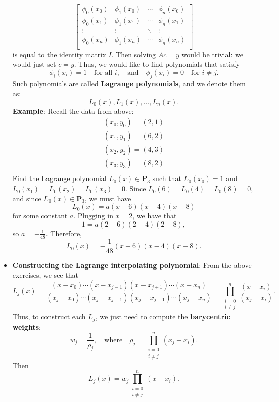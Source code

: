 \documentclass{report}
\begin{document}
\begin{itemize}
$$\begin{bmatrix}
        \phi_0(x_0) & \phi_1(x_0) & \cdots & \phi_n(x_0)\\
        \phi_0(x_1) & \phi_1(x_1) & \cdots & \phi_n(x_1)\\
        \vdots & \vdots & \ddots & \vdots\\
        \phi_0(x_n) & \phi_1(x_n) & \cdots & \phi_n(x_n)\\
    \end{bmatrix}
    $$
    is equal to the identity matrix $I$. Then solving $Ac = y$ would be trivial: we would just set $c = y$.
    \bigbreak \noindent 
    Thus, we would like to find polynomials that satisfy
    $$
    \phi_i(x_i) = 1 \quad \text{for all } i, \quad \text{and} \quad \phi_j(x_i) = 0 \quad \text{for } i \neq j.
    $$
    Such polynomials are called \textbf{Lagrange polynomials}, and we denote them as:
    $$L_0(x), L_1(x), \ldots, L_n(x).$$
    \bigbreak \noindent 
    \textbf{Example}: Recall the data from above:
    \begin{align*}
        (x_0,y_0) = (2,1)\\
        (x_1,y_1) = (6,2)\\
        (x_2, y_2) = (4,3)\\
        (x_3, y_3) = (8,2)\\
    \end{align*}
    Find the Lagrange polynomial $L_0(x) \in \mathbf{P}_3$ such that $L_0(x_0) = 1$ and $L_0(x_1) = L_0(x_2) = L_0(x_3) = 0$.
    \bigbreak \noindent 
    Since $L_0(6)= L_0(4) = L_0(8) = 0$, and since $L_0(x) \in \mathbf{P}_3$, we must have
    $$L_0(x) = a(x-6)(x-4)(x-8)$$
    for some constant $a$.
    \bigbreak \noindent 
    Plugging in $x = 2$, we have that
    $$1 = a(2-6)(2-4)(2-8),$$
    so $a = -\frac{1}{48}$. Therefore,
    $$L_0(x) = -\frac{1}{48}(x-6)(x-4)(x-8).$$
\item \textbf{Constructing the Lagrange interpolating polynomial}:
    From the above exercises, we see that
    $$ L_j(x) = \frac{(x-x_0)\cdots(x-x_{j-1})(x-x_{j+1})\cdots(x-x_n)}{(x_j-x_0)\cdots(x_j-x_{j-1})(x_j-x_{j+1})\cdots(x_j-x_n)} 
    = 
    \prod_{\substack{i = 0 \\ i \neq j}}^n \frac{(x-x_i)}{(x_j-x_i)}.$$
    Thus, to construct each $L_j$, we just need to compute the \textbf{barycentric weights}:
    $$
    w_j = \frac{1}{\rho_j}, \quad \text{where} \quad \rho_j = \prod_{\substack{i = 0 \\ i \neq j}}^n (x_j-x_i).
    $$
    Then
    $$L_j(x) = w_j \prod_{\substack{i = 0 \\ i \neq j}}^n (x-x_i).$$

\end{itemize}
\end{document}
